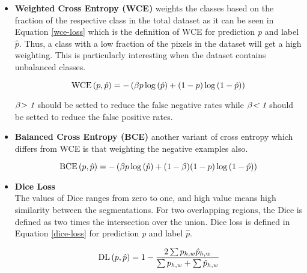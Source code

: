         \begin{itemize}

            \item \textbf{Weighted Cross Entropy (WCE)} weights the classes based on the fraction of the respective class in the total dataset as it can be seen in Equation \eqref{wce-loss} which is the definition of WCE for prediction \emph{p} and label $\hat{p}$.
                    Thus, a class with a low fraction of the pixels in the dataset will get a high weighting. This is particularly interesting when the dataset contains unbalanced classes.

                    \begin{equation}
                        \text{WCE}\left(p, \hat{p}\right) = -\left(\beta p \log\left(\hat{p}\right) + (1-p) \log\left(1 - \hat{p}\right)\right) \label{wce-loss} \\
                    \end{equation}

                    $\beta \emph{> 1}$ should be setted to reduce the false negative rates while $\beta \emph{< 1}$ should be setted to reduce the false positive rates.

            \item \textbf{Balanced Cross Entropy (BCE)} another variant of cross entropy which differs from WCE is that weighting the negative examples also.

                    \begin{equation}
                        \text{BCE}\left(p, \hat{p}\right) = -\left(\beta p \log\left(\hat{p}\right) + (1 - \beta)(1-p) \log\left(1 - \hat{p}\right)\right) \label{bce-loss} \\
                    \end{equation}

            \item \textbf{Dice Loss}\\

                    The values of Dice ranges from zero to one, and high value means high similarity between the segmentations.
                    For two overlapping regions, the Dice is defined as two times the intersection over the union.
                    Dice loss is defined in Equation \eqref{dice-loss} for prediction \emph{p} and label $\hat{p}$.

                    \begin{equation}
                        \text{DL}\left(p, \hat{p}\right) = 1 - \frac{2\sum p_{h,w}\hat{p}_{h,w}}{\sum p_{h,w} + \sum \hat{p}_{h,w}} \label{dice-loss} \\
                    \end{equation}

        \end{itemize}

